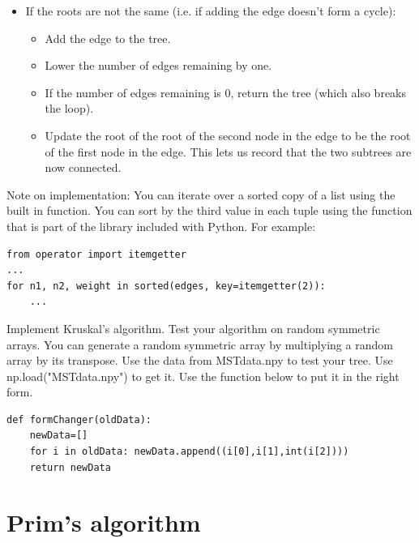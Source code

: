 \begin{itemize}
\begin{itemize}
	\item If the roots are not the same (i.e. if adding the edge doesn't form a cycle):

		\begin{itemize}

		\item Add the edge to the tree.

		\item Lower the number of edges remaining by one.

		\item If the number of edges remaining is 0, return the tree (which also breaks the loop).

		\item Update the root of the root of the second node in the edge to be the root of the first node in the edge.
			This lets us record that the two subtrees are now connected.

		\end{itemize}

	\end{itemize}

\end{itemize}
Note on implementation: You can iterate over a sorted copy of a list using the built in  function.
You can sort by the third value in each tuple using the  function that is part of the  library included with Python.
For example:
\begin{lstlisting}
from operator import itemgetter
...
for n1, n2, weight in sorted(edges, key=itemgetter(2)):
    ...
\end{lstlisting}

\begin{problem}
Implement Kruskal's algorithm.
Test your algorithm on random symmetric arrays.
You can generate a random symmetric array by multiplying a random array by its transpose.
Use the data from MSTdata.npy to test your tree.
Use np.load("MSTdata.npy") to get it.
Use the  function below to put it in the right form.
\begin{lstlisting}
def formChanger(oldData):
    newData=[]
    for i in oldData: newData.append((i[0],i[1],int(i[2])))
    return newData
\end{lstlisting}
\end{problem}
\section*{Prim's algorithm}

